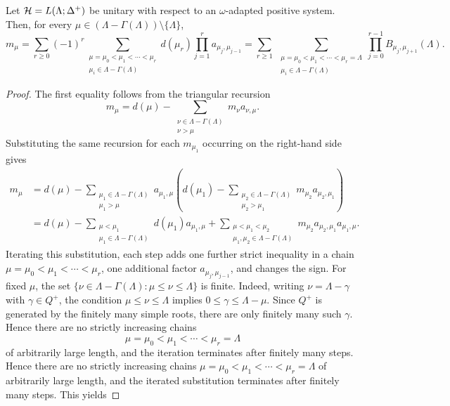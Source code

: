 \begin{theorem}\label{thm::closed_formula}
Let ${\mathcal{H}}=L(\Lambda;\Delta^+)$ be unitary with respect to an $\omega$-adapted positive system. Then, for every
$\mu\in(\Lambda-\Gamma(\Lambda))\setminus\{\Lambda\}$,
\[
m_\mu = 
\sum_{r\geq0}(-1)^r
\sum_{\substack{
\mu=\mu_0<\mu_1<\cdots<\mu_r\\
\mu_i\in \Lambda-\Gamma(\Lambda)
}}
d(\mu_r)\prod_{j=1}^r a_{\mu_j,\mu_{j-1}}
=
\sum_{r\geq1}
\ \sum_{\substack{
\mu=\mu_0<\mu_1<\cdots<\mu_r=\Lambda\\
\mu_i\in\Lambda-\Gamma(\Lambda)
}}
\prod_{j=0}^{r-1}
B_{\mu_j,\mu_{j+1}}(\Lambda).
\]
\end{theorem}

\begin{proof} The first equality follows from the triangular recursion
\[
m_\mu
=
d(\mu)
-
\sum_{\substack{\nu\in \Lambda-\Gamma(\Lambda)\\ \nu>\mu}}
m_\nu a_{\nu,\mu}.
\]
Substituting the same recursion for each $m_{\mu_1}$ occurring on the right-hand side gives
\[
\begin{aligned}
m_\mu
&=
d(\mu)
-
\sum_{\substack{\mu_1\in \Lambda-\Gamma(\Lambda)\\ \mu_1>\mu}}
a_{\mu_1,\mu}
\left(
d(\mu_1)
-
\sum_{\substack{\mu_2\in \Lambda-\Gamma(\Lambda)\\ \mu_2>\mu_1}}
m_{\mu_2}a_{\mu_2,\mu_1}
\right)\\
&=
d(\mu)
-
\sum_{\substack{\mu<\mu_1\\ \mu_1\in \Lambda-\Gamma(\Lambda)}}
d(\mu_1)a_{\mu_1,\mu}
+
\sum_{\substack{\mu<\mu_1<\mu_2\\ \mu_1,\mu_2\in \Lambda-\Gamma(\Lambda)}}
m_{\mu_2}a_{\mu_2,\mu_1}a_{\mu_1,\mu}.
\end{aligned}
\]
Iterating this substitution, each step adds one further strict inequality in a chain $\mu=\mu_0<\mu_1<\cdots<\mu_r$, one additional factor $a_{\mu_j,\mu_{j-1}}$, and changes the sign. For fixed $\mu$, the set
$
\{\nu\in\Lambda-\Gamma(\Lambda):\mu\leq\nu\leq\Lambda\}
$
is finite. Indeed, writing $\nu=\Lambda-\gamma$ with $\gamma\in Q^{+}$, the condition
$\mu\leq\nu\leq\Lambda$ implies
$
0\leq\gamma\leq\Lambda-\mu.
$
Since $Q^{+}$ is generated by the finitely many simple roots, there are only finitely many such
$\gamma$. Hence there are no strictly increasing chains
\[
\mu=\mu_{0}<\mu_{1}<\cdots<\mu_{r}=\Lambda
\]
of arbitrarily large length, and the iteration terminates after finitely many steps. Hence there are no strictly increasing chains $\mu=\mu_0<\mu_1<\cdots<\mu_r=\Lambda$ of arbitrarily large length, and the iterated substitution terminates after finitely many steps. This yields

\end{proof}
